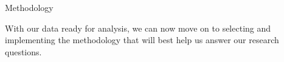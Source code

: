 \begin{frame}{Methodology}
    \begin{center}
        With our data ready for analysis, we can now move on to selecting and implementing the methodology that will best help us answer our research questions.
        
    \end{center}
\end{frame}